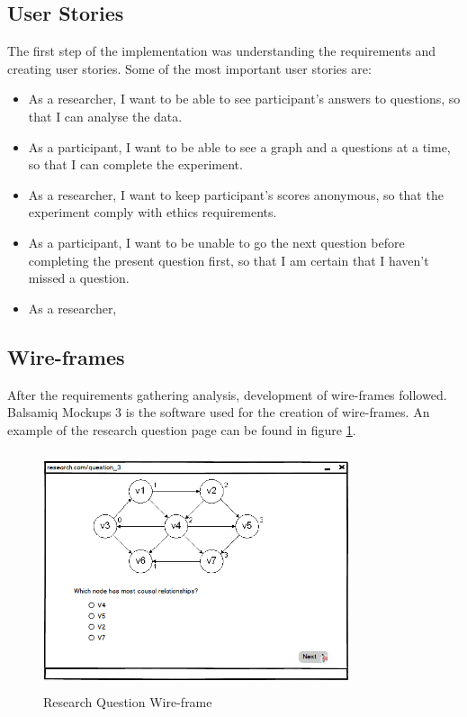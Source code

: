 \documentclass{l4proj}
\begin{document}
\subsection{User Stories}

The first step of the implementation was understanding the requirements and creating user stories. Some of the most important user stories are:

\begin{itemize}
   \item As a researcher, I want to be able to see participant's answers to questions, so that I can analyse the data.
   \item As a participant, I want to be able to see a graph and a questions at a time, so that I can complete the experiment.
   \item As a researcher, I want to keep participant's scores anonymous, so that the experiment comply with ethics requirements.
   \item As a participant, I want to be unable to go the next question before completing the present question first, so that I am certain that I haven't missed a question.
   \item As a researcher,
\end{itemize}

\subsection{Wire-frames}
After the requirements gathering analysis, development of wire-frames followed. Balsamiq Mockups 3 is the software used for the creation of wire-frames. An example of the research question page can be found in figure \ref{researchQuestion}.

\begin{figure}[H]
\centering
\includegraphics[width=9cm,height=7cm]{researchQuestion.PNG}
\caption{Research Question Wire-frame}
\label{researchQuestion}
\end{figure}
 
\end{document}
